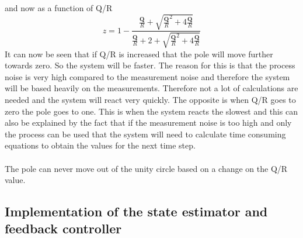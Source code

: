 and now as a function of Q/R
\begin{equation}
    z = 1 - \frac{\frac{\textbf{Q}}{R}+\sqrt{\frac{\textbf{Q}}{R}^{2}+4\frac{\textbf{Q}}{R}}}{\frac{\textbf{Q}}{R}+2+\sqrt{\frac{\textbf{Q}}{R}^{2}+4\frac{\textbf{Q}}{R}}}
\end{equation}
It can now be seen that if Q/R is increased that the pole will move further towards zero. So the system will be faster. The reason for this is that the process noise is very high compared to the measurement noise and therefore the system will be based heavily on the measurements. Therefore not a lot of calculations are needed and the system will react very quickly. The opposite is when Q/R goes to zero the pole goes to one. This is when the system reacts the slowest and this can also be explained by the fact that if the measurement noise is too high and only the process can be used that the system will need to calculate time consuming equations to obtain the values for the next time step.\\
\\
The pole can never move out of the unity circle based on a change on the Q/R value.
\subsection{Implementation of the state estimator and feedback controller}

